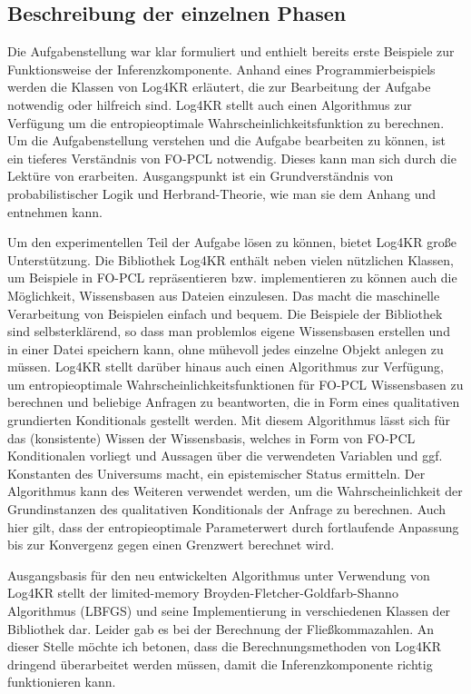 \documentclass[a4paper, 11pt]{book}
\begin{document}
\subsection{Beschreibung der einzelnen Phasen}
Die Aufgabenstellung war klar formuliert und enthielt bereits erste Beispiele zur Funktionsweise der Inferenzkomponente. Anhand eines Programmierbeispiels werden die Klassen von Log4KR erläutert, die zur Bearbeitung der Aufgabe notwendig oder hilfreich sind. Log4KR stellt auch einen Algorithmus zur Verfügung um die entropieoptimale Wahrscheinlichkeitsfunktion zu berechnen.
Um die Aufgabenstellung verstehen und die Aufgabe bearbeiten zu können, ist ein tieferes Verständnis von FO-PCL notwendig. Dieses kann man sich durch die Lektüre von \cite{Fis10} erarbeiten. Ausgangspunkt ist ein Grundverständnis von probabilistischer Logik und Herbrand-Theorie, wie man sie dem Anhang und \cite{BK15} entnehmen kann.

Um den experimentellen Teil der Aufgabe lösen zu können, bietet Log4KR große Unterstützung.
Die Bibliothek Log4KR enthält neben vielen nützlichen Klassen, um Beispiele in FO-PCL repräsentieren bzw. implementieren zu können auch die Möglichkeit, Wissensbasen aus Dateien einzulesen. Das macht die maschinelle Verarbeitung von Beispielen einfach und bequem. Die Beispiele der Bibliothek sind selbsterklärend, so dass man problemlos eigene Wissensbasen erstellen und in einer Datei speichern kann, ohne mühevoll jedes einzelne Objekt anlegen zu müssen. Log4KR stellt darüber hinaus auch einen Algorithmus zur Verfügung, um entropieoptimale Wahrscheinlichkeitsfunktionen für FO-PCL Wissensbasen zu berechnen und beliebige Anfragen zu beantworten, die in Form eines qualitativen grundierten Konditionals gestellt werden. 
Mit diesem Algorithmus lässt sich für das (konsistente) Wissen der Wissensbasis, welches in Form von FO-PCL Konditionalen vorliegt und Aussagen über die verwendeten Variablen und ggf. Konstanten des Universums macht, ein epistemischer Status ermitteln.
Der Algorithmus kann des Weiteren verwendet werden, um die Wahrscheinlichkeit der Grundinstanzen des qualitativen Konditionals der Anfrage zu berechnen. Auch hier gilt, dass der entropieoptimale Parameterwert durch fortlaufende Anpassung bis zur Konvergenz gegen einen Grenzwert berechnet wird. 

Ausgangsbasis für den neu entwickelten Algorithmus unter Verwendung von Log4KR stellt der limited-memory Broyden-Fletcher-Goldfarb-Shanno Algorithmus (LBFGS) und seine Implementierung in verschiedenen Klassen der Bibliothek dar. Leider gab es bei der Berechnung der Fließkommazahlen. An dieser Stelle möchte ich betonen, dass die Berechnungsmethoden von Log4KR dringend überarbeitet werden müssen, damit die Inferenzkomponente richtig funktionieren kann.
\end{document}
